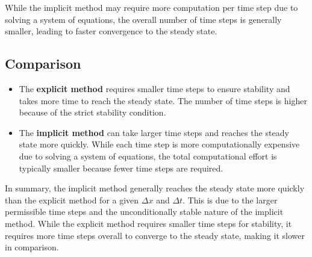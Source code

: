 \documentclass[12pt]{article}
\begin{document}
While the implicit method may require more computation per time step due to solving a system of equations, the overall number of time steps is generally smaller, leading to faster convergence to the steady state.

\subsection*{Comparison}
\begin{itemize}
    \item The \textbf{explicit method} requires smaller time steps to ensure stability and takes more time to reach the steady state. The number of time steps is higher because of the strict stability condition.
    \item The \textbf{implicit method} can take larger time steps and reaches the steady state more quickly. While each time step is more computationally expensive due to solving a system of equations, the total computational effort is typically smaller because fewer time steps are required.
\end{itemize}

In summary, the implicit method generally reaches the steady state more quickly than the explicit method for a given \( \Delta x \) and \( \Delta t \). This is due to the larger permissible time steps and the unconditionally stable nature of the implicit method. While the explicit method requires smaller time steps for stability, it requires more time steps overall to converge to the steady state, making it slower in comparison.
\end{document}
